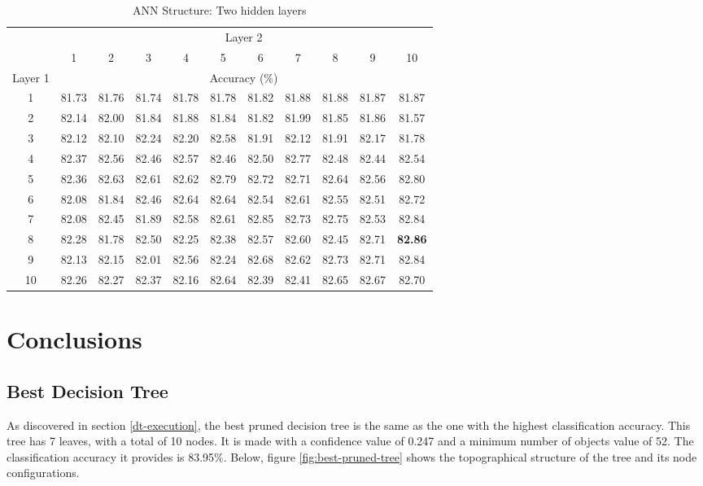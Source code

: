 \documentclass[12pt]{article}
\begin{document}
      \begin{table}[H]
        \centering
        \caption{ANN Structure: Two hidden layers}
          \begin{tabular}{c|cccccccccc}
          \toprule
                & \multicolumn{10}{c}{Layer 2} \\
                & 1     & 2     & 3     & 4     & 5     & 6     & 7     & 8     & 9     & 10 \\
          \midrule
          Layer 1 & \multicolumn{10}{c}{Accuracy (\%)} \\
          \midrule
          1     & 81.73 & 81.76 & 81.74 & 81.78 & 81.78 & 81.82 & 81.88 & 81.88 & 81.87 & 81.87 \\
          2     & 82.14 & 82.00 & 81.84 & 81.88 & 81.84 & 81.82 & 81.99 & 81.85 & 81.86 & 81.57 \\
          3     & 82.12 & 82.10 & 82.24 & 82.20 & 82.58 & 81.91 & 82.12 & 81.91 & 82.17 & 81.78 \\
          4     & 82.37 & 82.56 & 82.46 & 82.57 & 82.46 & 82.50 & 82.77 & 82.48 & 82.44 & 82.54 \\
          5     & 82.36 & 82.63 & 82.61 & 82.62 & 82.79 & 82.72 & 82.71 & 82.64 & 82.56 & 82.80 \\
          6     & 82.08 & 81.84 & 82.46 & 82.64 & 82.64 & 82.54 & 82.61 & 82.55 & 82.51 & 82.72 \\
          7     & 82.08 & 82.45 & 81.89 & 82.58 & 82.61 & 82.85 & 82.73 & 82.75 & 82.53 & 82.84 \\
          8     & 82.28 & 81.78 & 82.50 & 82.25 & 82.38 & 82.57 & 82.60 & 82.45 & 82.71 & \textbf{82.86} \\
          9     & 82.13 & 82.15 & 82.01 & 82.56 & 82.24 & 82.68 & 82.62 & 82.73 & 82.71 & 82.84 \\
          10    & 82.26 & 82.27 & 82.37 & 82.16 & 82.64 & 82.39 & 82.41 & 82.65 & 82.67 & 82.70 \\
          \bottomrule
          \end{tabular}%
          \label{tab:ann-str-double}
      \end{table}%

\newpage
\section{Conclusions}
  \subsection{Best Decision Tree}
    As discovered in section \ref{dt-execution}, the best pruned decision tree is the same as the one with the highest classification accuracy. This tree has 7 leaves, with a total of 10 nodes. It is made with a confidence value of 0.247 and a minimum number of objects value of 52. The classification accuracy it provides is 83.95\%. Below, figure \ref{fig:best-pruned-tree} shows the topographical structure of the tree and its node configurations.
\end{document}
